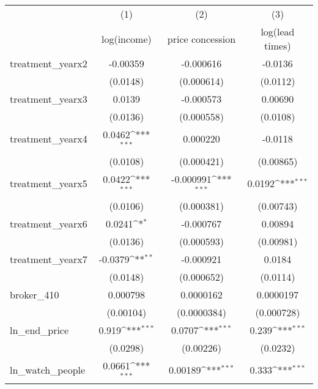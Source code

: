 {
\def\sym#1{\ifmmode^{#1}\else\(^{#1}\)\fi}
\begin{tabular}{l*{3}{c}}
\toprule
            &\multicolumn{1}{c}{(1)}&\multicolumn{1}{c}{(2)}&\multicolumn{1}{c}{(3)}\\
            &\multicolumn{1}{c}{log(income)}&\multicolumn{1}{c}{price concession}&\multicolumn{1}{c}{log(lead times)}\\
\midrule
treatment\_yearx2&    -0.00359         &   -0.000616         &     -0.0136         \\
            &    (0.0148)         &  (0.000614)         &    (0.0112)         \\
\addlinespace
treatment\_yearx3&      0.0139         &   -0.000573         &     0.00690         \\
            &    (0.0136)         &  (0.000558)         &    (0.0108)         \\
\addlinespace
treatment\_yearx4&      0.0462\sym{***}&    0.000220         &     -0.0118         \\
            &    (0.0108)         &  (0.000421)         &   (0.00865)         \\
\addlinespace
treatment\_yearx5&      0.0422\sym{***}&   -0.000991\sym{***}&      0.0192\sym{***}\\
            &    (0.0106)         &  (0.000381)         &   (0.00743)         \\
\addlinespace
treatment\_yearx6&      0.0241\sym{*}  &   -0.000767         &     0.00894         \\
            &    (0.0136)         &  (0.000593)         &   (0.00981)         \\
\addlinespace
treatment\_yearx7&     -0.0379\sym{**} &   -0.000921         &      0.0184         \\
            &    (0.0148)         &  (0.000652)         &    (0.0114)         \\
\addlinespace
broker\_410  &    0.000798         &   0.0000162         &   0.0000197         \\
            &   (0.00104)         & (0.0000384)         &  (0.000728)         \\
\addlinespace
ln\_end\_price&       0.919\sym{***}&      0.0707\sym{***}&       0.239\sym{***}\\
            &    (0.0298)         &   (0.00226)         &    (0.0232)         \\
\addlinespace
ln\_watch\_people&      0.0661\sym{***}&     0.00189\sym{***}&       0.333\sym{***}\\

\end{tabular}}
